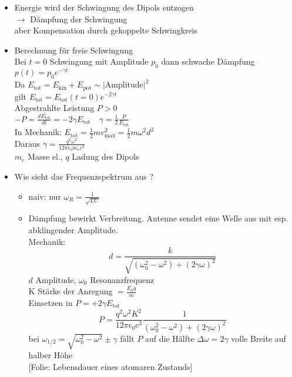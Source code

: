 \documentclass[titlepage,12pt,a4paper,ngerman]{report}
\newcommand{\tx}[1]{\textrm{#1}}
\newcommand{\folie}[1]{\color{gray}[Folie: #1]\color{black}}
\begin{document}
\begin{itemize}
	\item Energie wird der Schwingung des Dipols entzogen\\
	$ \rightarrow $ Dämpfung der Schwingung\\
	aber Kompensation durch gekoppelte Schwingkreis
	\item Berechnung für freie Schwingung\\
	Bei $ t = 0 $ Schwingung mit Amplitude $ p_0 $ dann schwache Dämpfung $ p(t) = p_0 e^{-\gamma t} $\\
	Da $ E_{\tx{tot}} = E_{\tx{kin}} + E_{\tx{pot}} \sim |\tx{Amplitude}|^2 $\\
	gilt $ E_{\tx{tot}} = E_{\tx{tot}}(t=0) e^{-2 \gamma t} $\\
	Abgestrahlte Leistung $ P > 0 $\\
	$ -P = \frac{dE_{\tx{tot}}}{dt} = - 2 \gamma E_{\tx{tot}} \quad \gamma = \frac{1}{2} \frac{P}{E_{\tx{tot}}} $\\[5pt]
	In Mechanik: $ E_{\tx{tot}} = \frac{1}{2} m v_{\tx{max}}^2 = \frac{1}{2} m \omega^2 d^2 $\\
	Daraus $ \gamma = \frac{q^2 \omega^2}{12 \pi \epsilon_0 m_e c^3} $ \\
	$ m_e $ Masse el., $ q $ Ladung des Dipols
	\item Wie sieht das Frequenzspektrum aus ?\\
	\begin{itemize}
		\item naiv: nur $ \omega_R = \frac{1}{\sqrt{LC}} $
		\item Dämpfung bewirkt Verbreitung. Antenne sendet eine Welle aus mit esp. abklingender Amplitude.\\
		Mechanik: $$ d= \frac{k}{\sqrt{(\omega^2_0 - \omega^2) + (2\gamma \omega)^2}}$$
		$ d $ Amplitude, $ \omega_0 $ Resonanzfrequenz\\
		K Stärke der Anregung $ = \frac{E_0 q}{m} $\\
		Einsetzen in $ P = + 2 \gamma E_{\tx{tot}} $
		$$P = \frac{q^2 \omega^2 K^2}{12 \pi \epsilon_0 c^3} \frac{1}{(\omega_0^2 - \omega^2) + (2 \gamma \omega)^2}$$
		bei $ \omega_{1/2} = \sqrt{\omega_0^2 - \omega^2} \pm \gamma $ fällt $ P $ auf die Hälfte $ \Delta \omega = 2 \gamma $ volle Breite auf halber Höhe\\
		\folie{Lebensdauer eines atomaren Zustands}
	\end{itemize}
\end{itemize}
\end{document}
